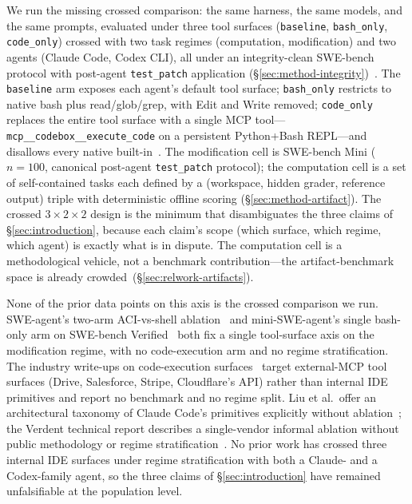 We run the missing crossed comparison: the same harness, the same models,
and the same prompts, evaluated under three tool surfaces
(\texttt{baseline}, \texttt{bash\_only}, \texttt{code\_only}) crossed
with two task regimes (computation, modification) and two agents (Claude
Code, Codex CLI), all under an integrity-clean SWE-bench protocol with
post-agent \texttt{test\_patch} application
(\S\ref{sec:method-integrity})~\cite{jimenez2024swebench}. The
\texttt{baseline} arm exposes each agent's default tool surface;
\texttt{bash\_only} restricts to native bash plus read/glob/grep, with
Edit and Write removed; \texttt{code\_only} replaces the entire tool
surface with a single MCP tool---\texttt{mcp\allowbreak\_\_codebox\allowbreak\_\_execute\allowbreak\_code}
on a persistent Python+Bash REPL---and disallows every native
built-in~\cite{anthropic2024mcp}. The modification cell is SWE-bench Mini
($n=100$, canonical post-agent \texttt{test\_patch} protocol); the
computation cell is a set of self-contained tasks each defined by a
(workspace, hidden grader, reference output) triple with deterministic
offline scoring (\S\ref{sec:method-artifact}). The crossed
$3 \times 2 \times 2$ design is the minimum that disambiguates the three
claims of \S\ref{sec:introduction}, because each claim's scope (which
surface, which regime, which agent) is exactly what is in dispute. The
computation cell is a methodological vehicle, not a benchmark
contribution---the artifact-benchmark space is already
crowded~(\S\ref{sec:relwork-artifacts}).

None of the prior data points on this axis is the crossed comparison we
run. SWE-agent's two-arm ACI-vs-shell ablation~\cite{yang2024sweagent}
and mini-SWE-agent's single bash-only arm on SWE-bench
Verified~\cite{repo:miniswagent} both fix a single tool-surface axis on
the modification regime, with no code-execution arm and no regime
stratification. The industry write-ups on code-execution
surfaces~\cite{blog:anthropic2025codemcp,blog:cloudflare2025codemode,blog:cloudflare2026codemodemcp}
target external-MCP tool surfaces (Drive, Salesforce, Stripe,
Cloudflare's API) rather than internal IDE primitives and report no
benchmark and no regime split. Liu et al.\ offer an architectural
taxonomy of Claude Code's primitives explicitly without
ablation~\cite{liu2026divecc}; the Verdent technical report describes a
single-vendor informal ablation without public methodology or regime
stratification~\cite{report:verdent2025swebench}. No prior work has
crossed three internal IDE surfaces under regime stratification with
both a Claude- and a Codex-family agent, so the three claims of
\S\ref{sec:introduction} have remained unfalsifiable at the population
level.

